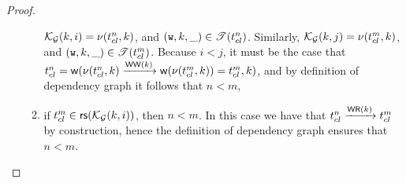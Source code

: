 \begin{proof}
\begin{enumerate}[label=(\roman*)]
\begin{enumerate}
$\mathcal{K}_{\mathcal{G}}(k, i) = \nu(t_{{cl}}^{n}, k)$, and $(\textnormal{\texttt w}, k, \_) \in \mathscr{T}(t_{{cl}}^{n})$. 
Similarly, $\mathcal{K}_{\mathcal{G}}(k, j) = \nu(t_{{cl}}^{m}, k)$, and $(\textnormal{\texttt w}, k, \_) \in \mathscr{T}(t_{{cl}}^{m})$. 
Because $i < j$, it must be the case that $t_{{cl}}^{n} = \mathsf{w}(\nu(t_{{cl}}^{n}, k) \xrightarrow{\mathsf{WW}(k)} 
\mathsf{w}(\nu(t_{{cl}}^{m}, k)) = t_{{cl}}^{m}, k)$, and by definition of dependency graph it follows that 
$n < m$, 
\item if $t_{{cl}}^{m} \in \mathsf{rs}(\mathcal{K}_{\mathcal{G}}(k, i))$, then $n < m$. In this case we have that 
$t_{{cl}}^{n} \xrightarrow{\mathsf{WR}(k)} t_{{cl}}^{m}$ by construction, hence the definition 
of dependency graph ensures that $n < m$. 
\end{enumerate}
\end{enumerate}
\end{proof}

